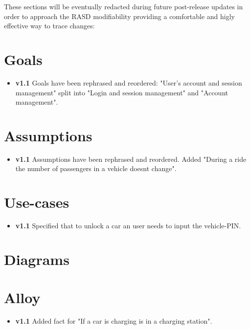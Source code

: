 These sections will be eventually redacted during future post-release updates in order to approach the RASD modifiability providing a comfortable and higly effective way to trace changes:

\section{Goals}
	\begin{itemize}
		\item \textbf{v1.1} Goals have been rephrased and reordered: "User’s account and session management" split into "Login and session management" and "Account management".
	\end{itemize}
\section{Assumptions}
	\begin{itemize}
		\item \textbf{v1.1} Assumptions have been rephrased and reordered. Added "During a ride the number of passengers in a vehicle doesnt change".
	\end{itemize}
\section{Use-cases}
	\begin{itemize}
		\item \textbf{v1.1} Specified that to unlock a car an user needs to input the vehicle-PIN.
	\end{itemize}
\section{Diagrams}
\section{Alloy}
	\begin{itemize}
		\item \textbf{v1.1} Added fact for "If a car is charging is in a charging station".
	\end{itemize}